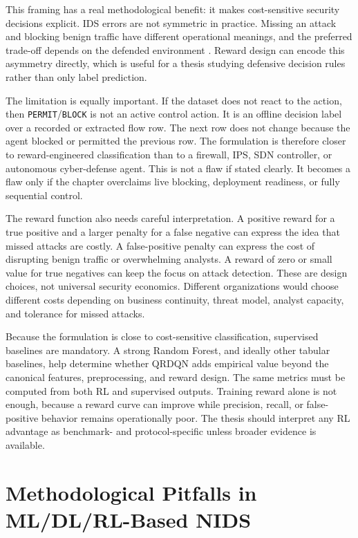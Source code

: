 This framing has a real methodological benefit: it makes cost-sensitive security decisions explicit. IDS errors are not symmetric in practice. Missing an attack and blocking benign traffic have different operational meanings, and the preferred trade-off depends on the defended environment \parencite{Lee2002CostSensitiveIDS,Cardenas2006IDSFramework}. Reward design can encode this asymmetry directly, which is useful for a thesis studying defensive decision rules rather than only label prediction.

The limitation is equally important. If the dataset does not react to the action, then \texttt{PERMIT}/\texttt{BLOCK} is not an active control action. It is an offline decision label over a recorded or extracted flow row. The next row does not change because the agent blocked or permitted the previous row. The formulation is therefore closer to reward-engineered classification than to a firewall, IPS, SDN controller, or autonomous cyber-defense agent. This is not a flaw if stated clearly. It becomes a flaw only if the chapter overclaims live blocking, deployment readiness, or fully sequential control.

The reward function also needs careful interpretation. A positive reward for a true positive and a larger penalty for a false negative can express the idea that missed attacks are costly. A false-positive penalty can express the cost of disrupting benign traffic or overwhelming analysts. A reward of zero or small value for true negatives can keep the focus on attack detection. These are design choices, not universal security economics. Different organizations would choose different costs depending on business continuity, threat model, analyst capacity, and tolerance for missed attacks.

Because the formulation is close to cost-sensitive classification, supervised baselines are mandatory. A strong Random Forest, and ideally other tabular baselines, help determine whether QRDQN adds empirical value beyond the canonical features, preprocessing, and reward design. The same metrics must be computed from both RL and supervised outputs. Training reward alone is not enough, because a reward curve can improve while precision, recall, or false-positive behavior remains operationally poor. The thesis should interpret any RL advantage as benchmark- and protocol-specific unless broader evidence is available.

\section{Methodological Pitfalls in ML/DL/RL-Based NIDS}

